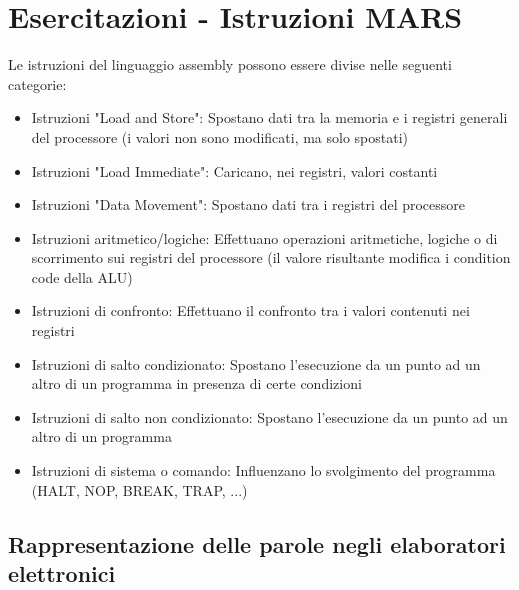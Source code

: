 \documentclass[12pt]{article} %
\begin{document}
\section{Esercitazioni - Istruzioni MARS}
Le istruzioni del linguaggio assembly possono essere divise nelle seguenti categorie:
\begin{itemize}
    \item Istruzioni "Load and Store": Spostano dati tra la memoria e i registri generali del processore (i valori non sono modificati, ma solo spostati)
    \item Istruzioni "Load Immediate": Caricano, nei registri, valori costanti
    \item Istruzioni "Data Movement": Spostano dati tra i registri del processore
    \item Istruzioni aritmetico/logiche: Effettuano operazioni aritmetiche, logiche o di scorrimento sui registri del processore (il valore risultante modifica i condition code della ALU)
    \item Istruzioni di confronto: Effettuano il confronto tra i valori contenuti nei registri
    \item Istruzioni di salto condizionato: Spostano l'esecuzione da un punto ad un altro di un programma in presenza di certe condizioni
    \item Istruzioni di salto non condizionato: Spostano l'esecuzione da un punto ad un altro di un programma
    \item Istruzioni di sistema o comando: Influenzano lo svolgimento del programma (HALT, NOP, BREAK, TRAP, ...)
\end{itemize}
\par\medskip\noindent
\subsection{Rappresentazione delle parole negli elaboratori elettronici}
\end{document}
